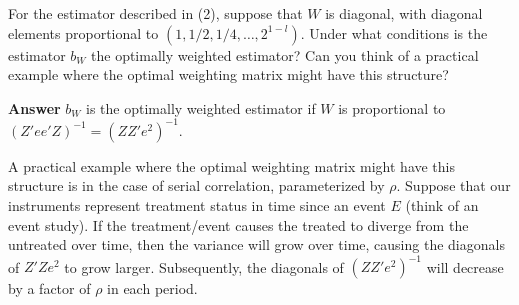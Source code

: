 \documentclass[11pt]{exam}
\begin{document}
\begin{questions}
\question For the estimator described in (2), suppose that $W$ is diagonal, with diagonal elements proportional to $(1,1/2,1/4,\ldots,2^{1-l})$. Under what conditions is the estimator $b_W$ the optimally weighted estimator? Can you think of a practical example where the optimal weighting matrix might have this structure?

\textbf{Answer} $b_W$ is the optimally weighted estimator if $W$ is proportional to $(Z'ee'Z)^{-1} = (ZZ'e^2)^{-1}$. 

A practical example where the optimal weighting matrix might have this structure is in the case of serial correlation, parameterized by $\rho$. Suppose that our instruments represent treatment status in time since an event $E$ (think of an event study). If the treatment/event causes the treated to diverge from the untreated over time, then the variance will grow over time, causing the diagonals of $Z'Ze^2$ to grow larger. Subsequently, the diagonals of $(ZZ'e^2)^{-1}$ will decrease by a factor of $\rho$ in each period. 


\end{questions}
    
    
    
\end{document}

